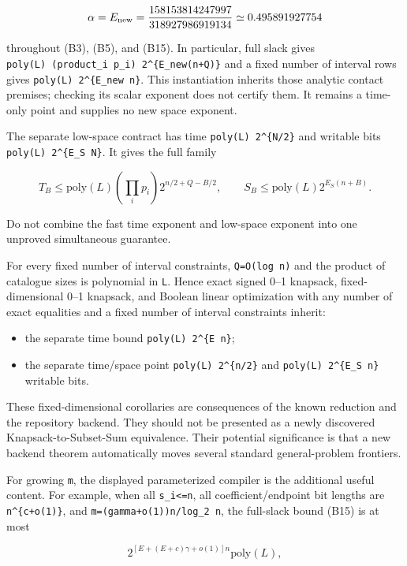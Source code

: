 \[
\alpha=E_{\rm new}=\frac{158153814247997}{318927986919134}\simeq0.495891927754
\]

throughout (B3), (B5), and (B15). In particular, full slack gives \texttt{poly(L)\ (product\_i\ p\_i)\ 2\^{}\{E\_new(n+Q)\}} and a fixed number of interval rows gives \texttt{poly(L)\ 2\^{}\{E\_new\ n\}}. This instantiation inherits those analytic contact premises; checking its scalar exponent does not certify them. It remains a time-only point and supplies no new space exponent.

The separate low-space contract has time \texttt{poly(L\textquotesingle{})\ 2\^{}\{N/2\}} and writable bits \texttt{poly(L\textquotesingle{})\ 2\^{}\{E\_S\ N\}}. It gives the full family

\[
T_B\le\mathrm{poly}(L)\left(\prod_i p_i\right)2^{n/2+Q-B/2},
\qquad
S_B\le\mathrm{poly}(L)2^{E_S(n+B)}.
\tag{B16}
\]

Do not combine the fast time exponent and low-space exponent into one unproved simultaneous guarantee.

For every fixed number of interval constraints, \texttt{Q=O(log\ n)} and the product of catalogue sizes is polynomial in \texttt{L}. Hence exact signed 0--1 knapsack, fixed-dimensional 0--1 knapsack, and Boolean linear optimization with any number of exact equalities and a fixed number of interval constraints inherit:

\begin{itemize}
\tightlist
\item
  the separate time bound \texttt{poly(L)\ 2\^{}\{E\ n\}};
\item
  the separate time/space point \texttt{poly(L)\ 2\^{}\{n/2\}} and \texttt{poly(L)\ 2\^{}\{E\_S\ n\}} writable bits.
\end{itemize}

These fixed-dimensional corollaries are consequences of the known reduction and the repository backend. They should not be presented as a newly discovered Knapsack-to-Subset-Sum equivalence. Their potential significance is that a new backend theorem automatically moves several standard general-problem frontiers.

For growing \texttt{m}, the displayed parameterized compiler is the additional useful content. For example, when all \texttt{s\_i\textless{}=n}, all coefficient/endpoint bit lengths are \texttt{n\^{}\{c+o(1)\}}, and \texttt{m=(gamma+o(1))n/log\_2\ n}, the full-slack bound (B15) is at most

\[
2^{[E+(E+c)\gamma+o(1)]n}\mathrm{poly}(L),
\tag{B17}
\]

